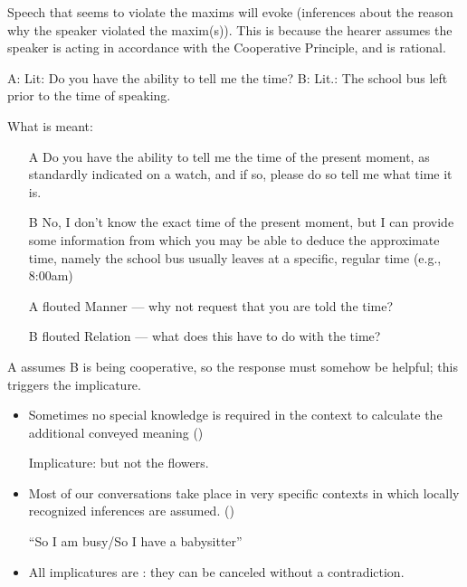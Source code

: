 \documentclass[a4paper,landscape,headrule,footrule,xetex]{foils}
\begin{document}

Speech that seems to violate the maxims will evoke 
(inferences about the reason why the speaker violated the maxim(s)).
This is because the hearer assumes the speaker is acting in accordance
with the Cooperative Principle, and is rational.
\begin{exe}
  \ex A: 
  \trans Lit: Do you have the ability to tell me the time?
  \ex B: 
  \trans Lit.: The school bus left prior to the time of speaking.
\end{exe}
\newpage
What is meant:
\begin{itemize}
\item [A] Do you have the ability to tell me the time of the present moment, as standardly indicated on a watch, and if so, please do so tell me what time it is.
\item [B] No, I don't know the exact time of the present moment, but I can provide some information from which you may be able to deduce the approximate time, namely the school bus usually leaves at a specific, regular time (e.g., 8:00am)
\end{itemize}

\begin{itemize}
\item [A] flouted Manner --- why not request that you are told the time?
\item [B] flouted Relation --- what does this have to do with the time?
\end{itemize}

A assumes B is being cooperative, so the response must somehow be helpful; this triggers the implicature.


\begin{itemize}
\item Sometimes no special knowledge is required in the context to
  calculate the additional conveyed meaning 
  ()
  \begin{exe}
    \ex {}
    \ex {}
    \trans \textnormal{Implicature: but not the flowers.}
  \end{exe}
\item 
Most of our conversations take place in very specific contexts in
which locally recognized inferences are assumed. 
()

\begin{exe}
  \ex {}
  \ex {} ``So I am busy/So I have a babysitter''
\end{exe}
\item All implicatures are : they can be canceled
without a contradiction.

\begin{exe}
  \ex {}
\end{exe}
\end{itemize}
\end{document}
